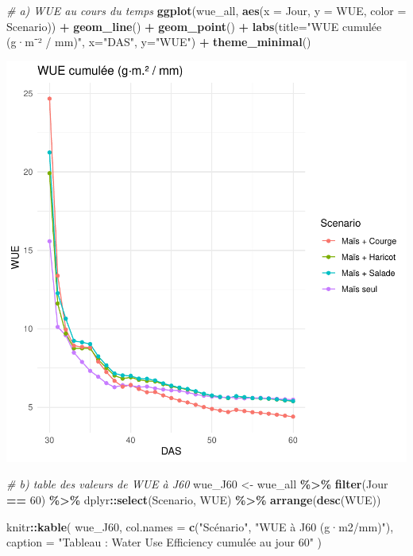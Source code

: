 \documentclass[
]{article}
\newenvironment{Shaded}{\begin{snugshade}}{\end{snugshade}}
\newcommand{\AttributeTok}[1]{\textcolor[rgb]{0.13,0.29,0.53}{#1}}
\newcommand{\CommentTok}[1]{\textcolor[rgb]{0.56,0.35,0.01}{\textit{#1}}}
\newcommand{\DecValTok}[1]{\textcolor[rgb]{0.00,0.00,0.81}{#1}}
\newcommand{\FunctionTok}[1]{\textcolor[rgb]{0.13,0.29,0.53}{\textbf{#1}}}
\newcommand{\NormalTok}[1]{#1}
\newcommand{\OtherTok}[1]{\textcolor[rgb]{0.56,0.35,0.01}{#1}}
\newcommand{\SpecialCharTok}[1]{\textcolor[rgb]{0.81,0.36,0.00}{\textbf{#1}}}
\newcommand{\StringTok}[1]{\textcolor[rgb]{0.31,0.60,0.02}{#1}}
\begin{document}
\begin{Shaded}
\begin{Highlighting}[]
\CommentTok{\# a) WUE au cours du temps}
\FunctionTok{ggplot}\NormalTok{(wue\_all, }\FunctionTok{aes}\NormalTok{(}\AttributeTok{x =}\NormalTok{ Jour, }\AttributeTok{y =}\NormalTok{ WUE, }\AttributeTok{color =}\NormalTok{ Scenario)) }\SpecialCharTok{+}
  \FunctionTok{geom\_line}\NormalTok{() }\SpecialCharTok{+} \FunctionTok{geom\_point}\NormalTok{() }\SpecialCharTok{+}
  \FunctionTok{labs}\NormalTok{(}\AttributeTok{title=}\StringTok{"WUE cumulée (g·m⁻² / mm)"}\NormalTok{, }\AttributeTok{x=}\StringTok{"DAS"}\NormalTok{, }\AttributeTok{y=}\StringTok{"WUE"}\NormalTok{) }\SpecialCharTok{+}
  \FunctionTok{theme\_minimal}\NormalTok{()}
\end{Highlighting}
\end{Shaded}

\begin{center}\includegraphics[width=0.7\linewidth]{Rapport_final_Maxime_CORNEZ_files/figure-latex/WUE-1} \end{center}

\begin{Shaded}
\begin{Highlighting}[]
\CommentTok{\# b) table des valeurs de WUE à J60}
\NormalTok{wue\_J60 }\OtherTok{\textless{}{-}}\NormalTok{ wue\_all }\SpecialCharTok{\%\textgreater{}\%}
  \FunctionTok{filter}\NormalTok{(Jour }\SpecialCharTok{==} \DecValTok{60}\NormalTok{) }\SpecialCharTok{\%\textgreater{}\%}
\NormalTok{  dplyr}\SpecialCharTok{::}\FunctionTok{select}\NormalTok{(Scenario, WUE) }\SpecialCharTok{\%\textgreater{}\%}
  \FunctionTok{arrange}\NormalTok{(}\FunctionTok{desc}\NormalTok{(WUE))}

\NormalTok{knitr}\SpecialCharTok{::}\FunctionTok{kable}\NormalTok{(}
\NormalTok{  wue\_J60,}
  \AttributeTok{col.names =} \FunctionTok{c}\NormalTok{(}\StringTok{"Scénario"}\NormalTok{, }\StringTok{"WUE à J60 (g·m2/mm)"}\NormalTok{),}
  \AttributeTok{caption   =} \StringTok{"Tableau : Water Use Efficiency cumulée au jour 60"}
\NormalTok{)}
\end{Highlighting}
\end{Shaded}
\end{document}
